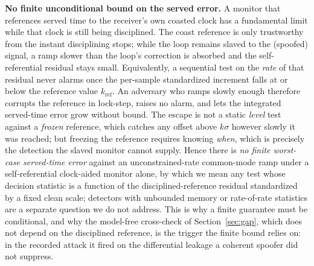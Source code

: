 \documentclass[conference]{IEEEtran}
\begin{document}
\textbf{No finite unconditional bound on the served error.} A monitor that
references served time to the receiver's own coasted clock has a fundamental
limit while that clock is still being disciplined. The coast reference is only
trustworthy from the instant disciplining stops; while the loop remains slaved to
the (spoofed) signal, a ramp slower than the loop's correction is absorbed and the
self-referential residual stays small. Equivalently, a sequential test on the
\emph{rate} of that residual never alarms once the per-sample standardized
increment falls at or below the reference value $k_{\mathrm{ref}}$. An adversary
who ramps slowly enough therefore corrupts the reference in lock-step, raises no
alarm, and lets the integrated served-time error grow without bound. The escape is
not a static \emph{level} test against a \emph{frozen} reference, which catches any
offset above $k\sigma$ however slowly it was reached; but freezing the reference
requires knowing \emph{when}, which is precisely the detection the slaved monitor
cannot supply. Hence there is \emph{no finite worst-case served-time error} against
an unconstrained-rate common-mode ramp under a self-referential clock-aided monitor
alone, by which we mean any test whose decision statistic is a function of the
disciplined-reference residual standardized by a fixed clean scale; detectors with
unbounded memory or rate-of-rate statistics are a separate question we do not
address. This is why a finite guarantee must be conditional, and why the model-free
cross-check of Section~\ref{sec:gap}, which does not depend on the disciplined
reference, is the trigger the finite bound relies on: in the recorded attack it
fired on the differential leakage a coherent spoofer did not suppress.
\end{document}
